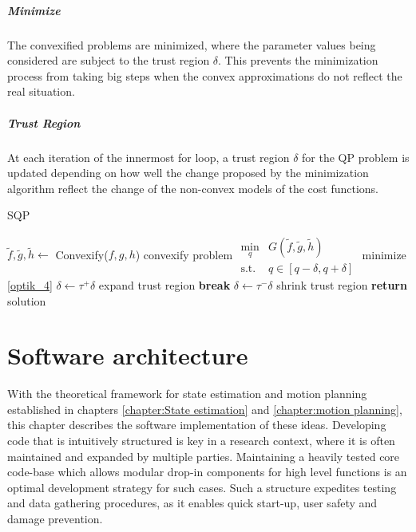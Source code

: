 \documentclass[times, utf8, diplomski, english]{fer}
\begin{document}
\paragraph*{Minimize}
The convexified problems are minimized, where the parameter values being considered are subject to the trust region $\delta$.
This prevents the minimization process from taking big steps when the convex approximations do not reflect the real situation.
\paragraph*{Trust Region}
At each iteration of the innermost for loop, a trust region $\delta$ for the QP problem is updated depending on how well the change proposed by the minimization algorithm reflect the change of the non-convex models of the cost functions. 
\begin{algorithm}
\label{optik_alg}
\caption{SQP}
\begin{algorithmic}
\State $\tilde{f}, \tilde{g}, \tilde{h} \gets$ Convexify($f,g,h$)
\Comment convexify problem
\State $ \begin{array}{rl} \min\limits_{q} & G(\tilde{f}, \tilde{g}, \tilde{h}) \\
 \mbox{s.t.} & q \in \left[q - \delta, q + \delta \right] \end{array}$
\Comment minimize \eqref{optik_4}
    \State $\delta \gets \tau^+ \delta$
    	\Comment expand trust region
    \State \textbf{break}
\EndIf
\State $\delta \gets \tau^- \delta$
\Comment shrink trust region 
    \State \textbf{return} solution
\EndIf
\EndFor
\EndFor
\EndFor
\end{algorithmic}
\end{algorithm}


























\chapter{Software architecture}
With the theoretical framework for state estimation and motion planning established in chapters \ref{chapter:State estimation} and \ref{chapter:motion planning}, this chapter describes the software implementation of these ideas.
Developing code that is intuitively structured is key in a research context, where it is often maintained and expanded by multiple parties.
Maintaining a heavily tested core code-base which allows modular drop-in components for high level functions is an optimal development strategy for such cases.
Such a structure expedites testing and data gathering procedures, as it enables quick start-up, user safety and damage prevention.
\end{document}
